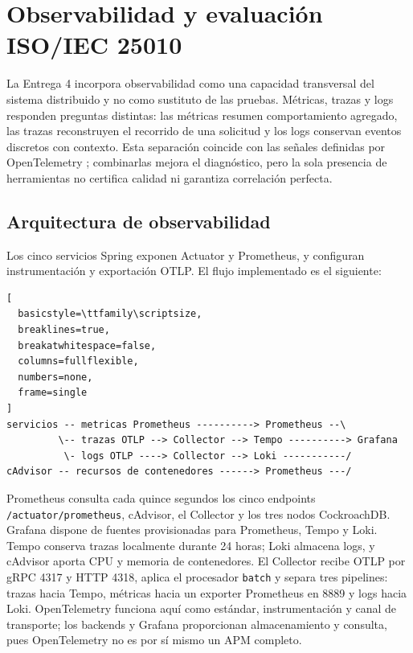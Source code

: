 \section{Observabilidad y evaluación ISO/IEC 25010}
\label{sec:observabilidad-iso}

La Entrega 4 incorpora observabilidad como una capacidad transversal del
sistema distribuido y no como sustituto de las pruebas. Métricas, trazas y logs
responden preguntas distintas: las métricas resumen comportamiento agregado,
las trazas reconstruyen el recorrido de una solicitud y los logs conservan
eventos discretos con contexto. Esta separación coincide con las señales
definidas por OpenTelemetry \cite{opentelemetry2026signals}; combinarlas mejora
el diagnóstico, pero la sola presencia de herramientas no certifica calidad ni
garantiza correlación perfecta.

\subsection{Arquitectura de observabilidad}
\label{subsec:arquitectura-observabilidad}

Los cinco servicios Spring exponen Actuator y Prometheus, y configuran
instrumentación y exportación OTLP. El flujo implementado es el siguiente:

\begin{center}
\begin{lstlisting}[
  basicstyle=\ttfamily\scriptsize,
  breaklines=true,
  breakatwhitespace=false,
  columns=fullflexible,
  numbers=none,
  frame=single
]
servicios -- metricas Prometheus ----------> Prometheus --\
         \-- trazas OTLP --> Collector --> Tempo ----------> Grafana
          \- logs OTLP ----> Collector --> Loki -----------/
cAdvisor -- recursos de contenedores ------> Prometheus ---/
\end{lstlisting}
\end{center}

Prometheus consulta cada quince segundos los cinco endpoints
\texttt{/actuator/prometheus}, cAdvisor, el Collector y los tres nodos
CockroachDB. Grafana dispone de fuentes provisionadas para Prometheus, Tempo y
Loki. Tempo conserva trazas localmente durante 24 horas; Loki almacena logs, y
cAdvisor aporta CPU y memoria de contenedores. El Collector recibe OTLP por
gRPC 4317 y HTTP 4318, aplica el procesador \texttt{batch} y separa tres
pipelines: trazas hacia Tempo, métricas hacia un exporter Prometheus en 8889 y
logs hacia Loki. OpenTelemetry funciona aquí como estándar, instrumentación y
canal de transporte; los backends y Grafana proporcionan almacenamiento y
consulta, pues OpenTelemetry no es por sí mismo un APM completo.


